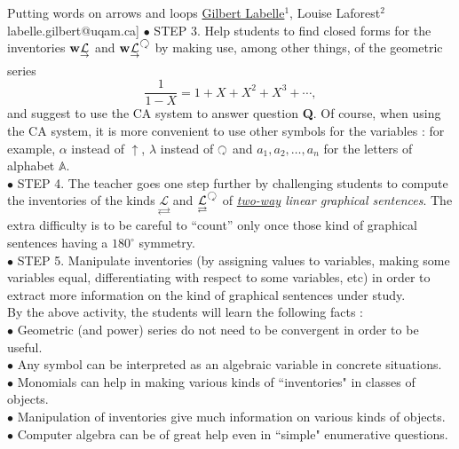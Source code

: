 \begin{abstract_online}{Putting words on arrows and loops}{%
        \underline{Gilbert Labelle}$^{1}$, Louise Laforest$^{2}$}{labelle.gilbert@uqam.ca]
        }
\noindent $\bullet$ STEP 3. Help students to find closed forms for the inventories ${\bf{w}}\underset{\raisebox{0.4ex}{$\scriptstyle \rightarrow $}}{\mathcal{L}}$ and ${\bf{w}}\underset{\raisebox{0.4ex}{$\scriptstyle \rightarrow $}}{\mathcal{L}}^{\rotatebox[origin=c]{-180}{$\circlearrowright$}}$ by making use, among other things, of the geometric series
\begin{equation}
\frac{1}{1-X} = 1+X+X^2+X^3+\cdots,
\end{equation}
and suggest to use the CA system to answer question {\bf{Q}}. Of course, when using the CA system, it is more convenient to use other symbols for the variables : for example, $\alpha$ instead of $\uparrow$, $\lambda$ instead of ${\rotatebox[origin=c]{-180}{$\circlearrowright$}}$ and $a_1,a_2, \dots, a_n$ for the letters of alphabet $\mathbb{A}$. \\

\noindent $\bullet$ STEP 4. The teacher goes one step further by challenging students to compute the inventories of the kinds $\underset{\rightleftarrows}{\mathcal{L}}$ and  $\underset{\rightleftarrows}{\mathcal{L}}^{\rotatebox[origin=c]{-180}{$\circlearrowright$}}$ of {\emph{{\underline{two-way}} linear graphical sentences}}. The extra difficulty is to be careful to ``count'' only once those kind of graphical sentences having a $180^\circ$ symmetry.\\

\noindent $\bullet$ STEP 5. Manipulate inventories (by assigning values to variables, making some variables equal, differentiating with respect to some variables, etc) in order to extract more information on the kind of graphical sentences under study.\\

\noindent By the above activity, the students will learn the following facts :\\

\noindent $\bullet$ Geometric (and power) series do not need to be convergent in order to be useful.\\
$\bullet$ Any symbol can be interpreted as an algebraic variable in concrete situations.\\
$\bullet$ Monomials can help in making various kinds of ``inventories" in classes of objects.\\
$\bullet$ Manipulation of inventories give much information on various kinds of objects.\\
$\bullet$ Computer algebra can be of great help even in ``simple" enumerative questions.\\


\end{abstract_online}
